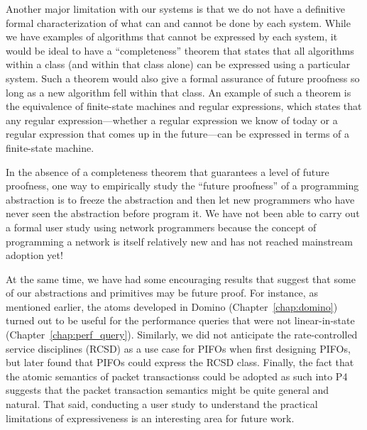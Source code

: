  Another major limitation with our systems
is that we do not have a definitive formal characterization of what can and
cannot be done by each system. While we have examples of algorithms that cannot
be expressed by each system, it would be ideal to have a ``completeness''
theorem that states that all algorithms within a class (and within that class
alone) can be expressed using a particular system. Such a theorem would also
give a formal assurance of future proofness so long as a new algorithm fell
within that class. An example of such a theorem is the equivalence of
finite-state machines and regular expressions, which states that any regular
expression---whether a regular expression we know of today or a regular
expression that comes up in the future---can be expressed in terms of a
finite-state machine.

 In the absence of a completeness theorem that
guarantees a level of future proofness, one way to empirically study the
``future proofness'' of a programming abstraction is to freeze the abstraction
and then let new programmers who have never seen the abstraction before program
it. We have not been able to carry out a formal user study using network
programmers because the concept of programming a network is itself relatively
new and has not reached mainstream adoption yet!

At the same time, we have had some encouraging results that suggest that some
of our abstractions and primitives may be future proof. For instance, as
mentioned earlier, the atoms developed in Domino (Chapter~\ref{chap:domino})
turned out to be useful for the performance queries that were not
linear-in-state (Chapter~\ref{chap:perf_query}). Similarly, we did not
anticipate the rate-controlled service disciplines (RCSD) as a use case for
PIFOs when first designing PIFOs, but later found that PIFOs could express the
RCSD class. Finally, the fact that the atomic semantics of  packet
transactionss could be adopted as such into P4 suggests that the packet
transaction semantics might be quite general and natural. That said, conducting
a user study to understand the practical limitations of expressiveness is an
interesting area for future work.



